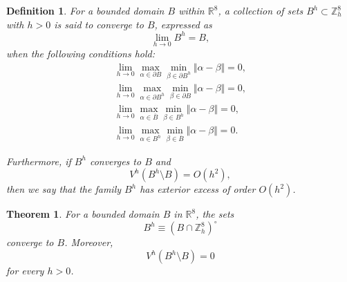 \documentclass[10pt,a4paper]{amsart}
\newtheorem{definition}{Definition}
\newtheorem{theorem}{Theorem}
\newcommand{\R}{\mathbb{R}}
\newcommand{\Z}{\mathbb Z}
\newcommand{\p}{\partial}
\begin{document}
\begin{definition}\label{2023-09-11 10:00:54}
For a bounded domain $B$ within $\R^8$,	
	a collection of sets $B^h\subset \Z_h^8$ with $h>0$ is said to converge to $B$, expressed as
   \[
\lim_{h\to 0} B^h= B,
\] when the following conditions hold:
    \begin{equation}
        \begin{aligned}
            \lim_{h\to 0} \max_{\alpha\in \p B }\min_{\beta\in \p B^h} \Vert \alpha-\beta\Vert=0,\\
            \lim_{h\to  0} \max_{\alpha\in \p B^h }\min_{\beta\in \p B } \Vert \alpha-\beta\Vert=0,\\
            \lim_{h\to  0} \max_{\alpha\in \overline B}\min_{\beta\in B^h } \Vert \alpha-\beta\Vert=0,\\
            \lim_{h\to  0} \max_{\alpha\in B^h }\min_{\beta\in \overline B } \Vert \alpha-\beta\Vert=0.
        \end{aligned}
    \end{equation}

Furthermore, if $B^h$ converges to $B$ and
\[
V^h(B^h\setminus B) = O(h^2),
\]
then we say that the family $B^h$ has \emph{exterior excess of order $O(h^2)$}.
\end{definition}

\begin{theorem}
	For a bounded domain  $B$ in $\R^8$, the sets
  \[
B^h \equiv (B \cap \Z_h^8)^\circ
\] converge to $B$. Moreover,
  \[
V^h(B^h\setminus B)=0
\]
  for every $h>0$.
\end{theorem}
\end{document}
